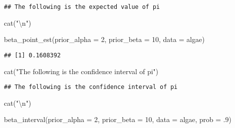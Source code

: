 \documentclass[
]{article}
\newenvironment{Shaded}{\begin{snugshade}}{\end{snugshade}}
\newcommand{\AttributeTok}[1]{\textcolor[rgb]{0.77,0.63,0.00}{#1}}
\newcommand{\DecValTok}[1]{\textcolor[rgb]{0.00,0.00,0.81}{#1}}
\newcommand{\FunctionTok}[1]{\textcolor[rgb]{0.00,0.00,0.00}{#1}}
\newcommand{\NormalTok}[1]{#1}
\newcommand{\SpecialCharTok}[1]{\textcolor[rgb]{0.00,0.00,0.00}{#1}}
\newcommand{\StringTok}[1]{\textcolor[rgb]{0.31,0.60,0.02}{#1}}
\begin{document}
\begin{verbatim}
## The following is the expected value of pi
\end{verbatim}

\begin{Shaded}
\begin{Highlighting}[]
\FunctionTok{cat}\NormalTok{(}\StringTok{"}\SpecialCharTok{\textbackslash{}n}\StringTok{"}\NormalTok{)}
\end{Highlighting}
\end{Shaded}

\begin{Shaded}
\begin{Highlighting}[]
\FunctionTok{beta\_point\_est}\NormalTok{(}\AttributeTok{prior\_alpha =} \DecValTok{2}\NormalTok{,}
               \AttributeTok{prior\_beta  =} \DecValTok{10}\NormalTok{,}
               \AttributeTok{data =}\NormalTok{ algae)}
\end{Highlighting}
\end{Shaded}

\begin{verbatim}
## [1] 0.1608392
\end{verbatim}

\begin{Shaded}
\begin{Highlighting}[]
\FunctionTok{cat}\NormalTok{(}\StringTok{"The following is the confidence interval of pi"}\NormalTok{)}
\end{Highlighting}
\end{Shaded}

\begin{verbatim}
## The following is the confidence interval of pi
\end{verbatim}

\begin{Shaded}
\begin{Highlighting}[]
\FunctionTok{cat}\NormalTok{(}\StringTok{"}\SpecialCharTok{\textbackslash{}n}\StringTok{"}\NormalTok{)}
\end{Highlighting}
\end{Shaded}

\begin{Shaded}
\begin{Highlighting}[]
\FunctionTok{beta\_interval}\NormalTok{(}\AttributeTok{prior\_alpha =} \DecValTok{2}\NormalTok{,}
              \AttributeTok{prior\_beta  =} \DecValTok{10}\NormalTok{,}
              \AttributeTok{data =}\NormalTok{ algae,}
              \AttributeTok{prob =}\NormalTok{ .}\DecValTok{9}\NormalTok{)}
\end{Highlighting}
\end{Shaded}
\end{document}
